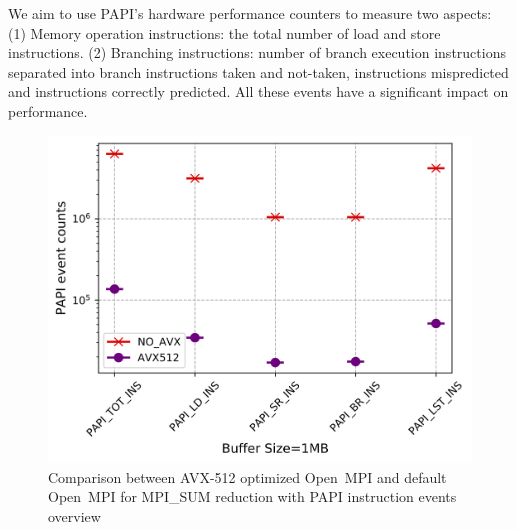 \documentclass[5p,times,twocolumn]{elsarticle}
\newcommand{\ompi}[0]{Open~MPI\xspace}
\begin{document}

We aim to use PAPI's hardware performance counters to measure two aspects:
(1) Memory operation instructions: the total number of load and store instructions.
(2) Branching instructions: number of branch execution instructions separated into branch instructions taken and not-taken,
instructions mispredicted and instructions correctly predicted. All these events have a significant impact on performance.

\begin{figure}[h]
    \centering
    \includegraphics[width=\linewidth]{papi_ins_review.png}
    \caption{Comparison between AVX-512 optimized \ompi and default \ompi for MPI\_SUM reduction with PAPI instruction events overview}
    \label{fig:papiins}%
\end{figure}
\end{document}
